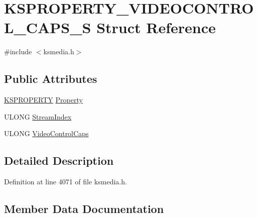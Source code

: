 \hypertarget{struct_k_s_p_r_o_p_e_r_t_y___v_i_d_e_o_c_o_n_t_r_o_l___c_a_p_s___s}{}\section{K\+S\+P\+R\+O\+P\+E\+R\+T\+Y\+\_\+\+V\+I\+D\+E\+O\+C\+O\+N\+T\+R\+O\+L\+\_\+\+C\+A\+P\+S\+\_\+S Struct Reference}
\label{struct_k_s_p_r_o_p_e_r_t_y___v_i_d_e_o_c_o_n_t_r_o_l___c_a_p_s___s}


{\ttfamily \#include $<$ksmedia.\+h$>$}

\subsection*{Public Attributes}
\begin{DoxyCompactItemize}
\item 
\hyperlink{ks_8h_a4392f77c74e868d813d46c39ada4d660}{K\+S\+P\+R\+O\+P\+E\+R\+TY} \hyperlink{struct_k_s_p_r_o_p_e_r_t_y___v_i_d_e_o_c_o_n_t_r_o_l___c_a_p_s___s_ae0c0fcaff2038fd67c88f2965d5f3697}{Property}
\item 
U\+L\+O\+NG \hyperlink{struct_k_s_p_r_o_p_e_r_t_y___v_i_d_e_o_c_o_n_t_r_o_l___c_a_p_s___s_a1426a2f5d673d5cddf13d5a3d738ca47}{Stream\+Index}
\item 
U\+L\+O\+NG \hyperlink{struct_k_s_p_r_o_p_e_r_t_y___v_i_d_e_o_c_o_n_t_r_o_l___c_a_p_s___s_a6ebfeef953cd807ea08cb9e28d3937e2}{Video\+Control\+Caps}
\end{DoxyCompactItemize}


\subsection{Detailed Description}


Definition at line 4071 of file ksmedia.\+h.



\subsection{Member Data Documentation}
